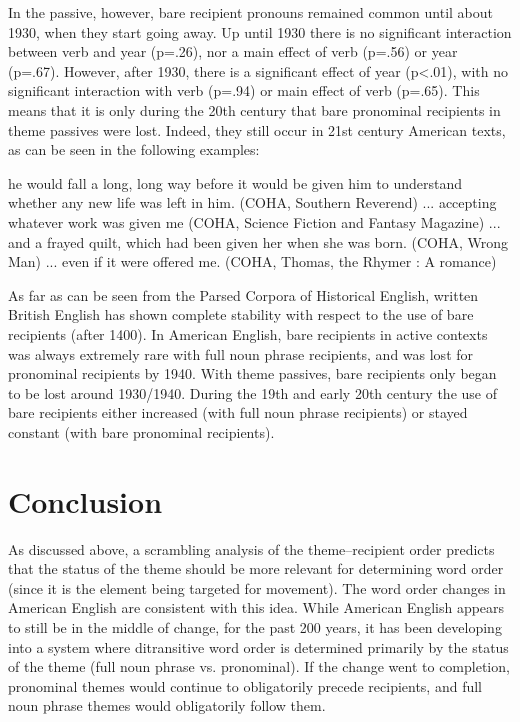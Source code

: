 In the passive, however, bare recipient pronouns remained common until about 1930, when they start going away. Up until 1930 there is no significant interaction between verb and year (p=.26), nor a main effect of verb (p=.56) or year (p=.67). However, after 1930, there is a significant effect of year (p\textless .01), with no significant interaction with verb (p=.94) or main effect of verb (p=.65). This means that it is only during the 20th century that bare pronominal recipients in theme passives were lost. Indeed, they still occur in 21st century American texts, as can be seen in the following examples: 

\begin{exe}
\ex 
\begin{xlist}
\ex he would fall a long, long way before it would be given him to understand whether any new life was left in him. (COHA, Southern Reverend)
\ex  ... accepting whatever work was given me (COHA, Science Fiction and Fantasy Magazine)
\ex ... and a frayed quilt, which had been given her when she was born. (COHA, Wrong Man)
\ex ... even if it were offered me. (COHA, Thomas, the Rhymer : A romance)
\end{xlist}
\end{exe}

As far as can be seen from the Parsed Corpora of Historical English, written British English has shown complete stability with respect to the use of bare recipients (after 1400). In American English, bare recipients in active contexts was always extremely rare with full noun phrase recipients, and was lost for pronominal recipients by 1940. With theme passives, bare recipients only began to be lost around 1930/1940. During the 19th and early 20th century the use of bare recipients either increased (with full noun phrase recipients) or stayed constant (with bare pronominal recipients).

\section{Conclusion}
As discussed above, a scrambling analysis of the theme--recipient order predicts that the status of the theme should be more relevant for determining word order (since it is the element being targeted for movement). The word order changes in American English are consistent with this idea. While American English appears to still be in the middle of change, for the past 200 years, it has been developing into a system where ditransitive word order is determined primarily by the status of the theme (full noun phrase vs. pronominal). If the change went to completion, pronominal themes would continue to obligatorily precede recipients, and full noun phrase themes would obligatorily follow them. 

